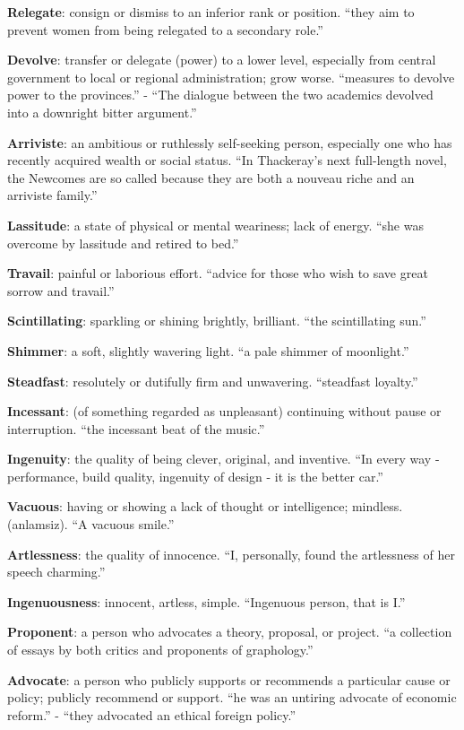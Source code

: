 \documentclass[12pt, a4paper]{ximera}
\begin{document}
\textbf{Relegate}: consign or dismiss to an inferior rank or position. ``they aim to prevent women from being relegated to a secondary role.''

\textbf{Devolve}: transfer or delegate (power) to a lower level, especially from central government to local or regional administration; grow worse. ``measures to devolve power to the provinces.'' - ``The dialogue between the two academics devolved into a downright bitter argument.''

\textbf{Arriviste}: an ambitious or ruthlessly self-seeking person, especially one who has recently acquired wealth or social status. ``In Thackeray's next full-length novel, the Newcomes are so called because they are both a nouveau riche and an arriviste family.''

\textbf{Lassitude}: a state of physical or mental weariness; lack of energy. ``she was overcome by lassitude and retired to bed.''

\textbf{Travail}: painful or laborious effort. ``advice for those who wish to save great sorrow and travail.''

\textbf{Scintillating}: sparkling or shining brightly, brilliant. ``the scintillating sun.''

\textbf{Shimmer}: a soft, slightly wavering light. ``a pale shimmer of moonlight.''

\textbf{Steadfast}: resolutely or dutifully firm and unwavering. ``steadfast loyalty.''

\textbf{Incessant}: (of something regarded as unpleasant) continuing without pause or interruption. ``the incessant beat of the music.''

\textbf{Ingenuity}: the quality of being clever, original, and inventive. ``In every way - performance, build quality, ingenuity of design - it is the better car.''

\textbf{Vacuous}: having or showing a lack of thought or intelligence; mindless. (anlamsiz). ``A vacuous smile.''

\textbf{Artlessness}: the quality of innocence. ``I, personally, found the artlessness of her speech charming.''

\textbf{Ingenuousness}: innocent, artless, simple. ``Ingenuous person, that is I.''

\textbf{Proponent}: a person who advocates a theory, proposal, or project. ``a collection of essays by both critics and proponents of graphology.''

\textbf{Advocate}: a person who publicly supports or recommends a particular cause or policy; publicly recommend or support. ``he was an untiring advocate of economic reform.'' - ``they advocated an ethical foreign policy.''
\end{document}
